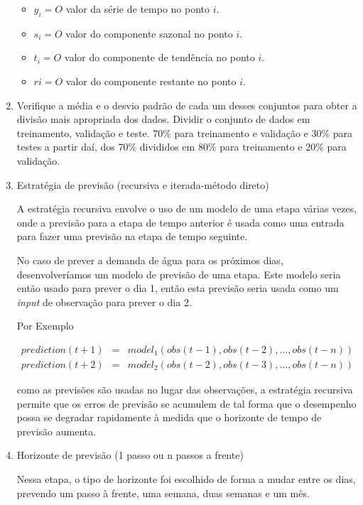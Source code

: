 \begin{enumerate}[start=1, label = {\textbf{Etapa} \arabic* } ]
    	\begin{itemize}
    		\item $y_i = O$ valor da série de tempo no ponto $i$.
    		\item $s_i = O$ valor do componente sazonal no ponto $i$.
    		\item $t_i = O$ valor do componente de tendência no ponto $i$.
    		\item $ri = O$ valor do componente restante no ponto $i$.
    	\end{itemize}
    	\item Verifique a média e o desvio padrão de cada um desses conjuntos para obter a divisão mais apropriada dos dados. Dividir o conjunto de dados em treinamento, validação e teste. 70\% para treinamento e validação e 30\% para testes a partir daí, dos 70\% divididos em 80\% para treinamento e 20\% para validação.\label{etp:4}
    	
    	
    	\item Estratégia de previsão (recursiva e iterada-método direto) \label{etp:5}
    	
    	A estratégia recursiva envolve o uso de um modelo de uma etapa várias vezes, onde a previsão para a etapa de tempo anterior é usada como uma entrada para fazer uma previsão na etapa de tempo seguinte.
    	
    	No caso de prever a demanda de água para os próximos dias, desenvolveríamos um modelo de previsão de uma etapa. Este modelo seria então usado para prever o dia 1, então esta previsão seria usada como um \textit{input} de observação para prever o dia 2.
    	 
    	Por Exemplo
    	
    	\begin{eqnarray}
    	prediction(t+1) &=& model_1(obs(t-1), obs(t-2), \ldots, obs(t-n))\\
    	prediction(t+2) &=& model_2(obs(t-2), obs(t-3), \ldots, obs(t-n))   	
    	\end{eqnarray}
    	
    	 como as previsões são usadas no lugar das observações, a estratégia recursiva permite que os erros de previsão se acumulem de tal forma que o desempenho possa se degradar rapidamente à medida que o horizonte de tempo de previsão aumenta.
    	
    	
    	\item Horizonte de previsão (1 passo ou n passos a frente) \label{etp:6}
    	
    	Nessa etapa, o tipo de horizonte foi escolhido de forma a mudar entre os dias, prevendo um passo à frente, uma semana, duas semanas e um mês.
    	

\end{enumerate}
